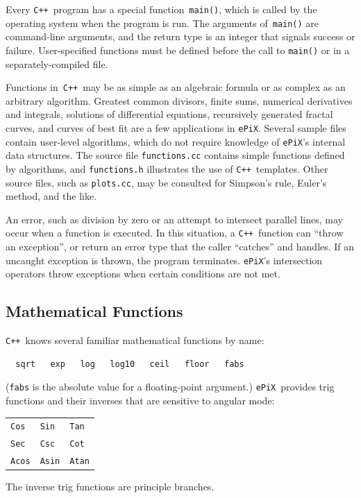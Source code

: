 \documentclass[12pt]{report}
\newcommand{\code}[1]{\texttt{#1}}
\newcommand{\filename}[1]{\texttt{#1}}
\newcommand{\ePiX}{\code{ePiX}}
\newcommand{\CXX}{\code{C++}}
\begin{document}
Every \CXX\ program has a special function~\code{main()}, which is
called by the operating system when the program is run. The arguments
of~\code{main()} are command-line arguments, and the return type is an
integer that signals success or failure. User-specified functions must
be defined before the call to \code{main()} or in a
separately-compiled file.

Functions in~\CXX\ may be as simple as an algebraic formula or as
complex as an arbitrary algorithm. Greatest common divisors, finite
sums, numerical derivatives and integrals, solutions of differential
equations, recursively generated fractal curves, and curves of best
fit are a few applications in \ePiX. Several sample files contain
user-level algorithms, which do not require knowledge of \ePiX's
internal data structures. The source file \filename{functions.cc}
contains simple functions defined by algorithms, and
\filename{functions.h} illustrates the use of \CXX\ templates. Other
source files, such as \filename{plots.cc}, may be consulted for
Simpson's rule, Euler's method, and the like.

An error, such as division by zero or an attempt to intersect parallel
lines, may occur when a function is executed. In this situation, a
\CXX\ function can ``throw an exception'', or return an error type
that the caller ``catches'' and handles. If an uncaught exception is
thrown, the program terminates. \ePiX's intersection operators throw
exceptions when certain conditions are not met.


\subsection*{Mathematical Functions}

\CXX~knows several familiar mathematical functions by name:
\begin{verbatim}
  sqrt   exp   log   log10   ceil   floor   fabs
\end{verbatim}
(\code{fabs} is the absolute value for a floating-point argument.)
\ePiX\ provides trig functions and their inverses that are sensitive
to angular mode:
\begin{center}
\begin{tabular}{p{1.25in}p{1.25in}p{1.25in}}
  \code{Cos}  & \code{Sin}  & \code{Tan} \\
  \code{Sec}  & \code{Csc}  & \code{Cot} \\
  \code{Acos} & \code{Asin} & \code{Atan}
\end{tabular}
\end{center}
The inverse trig functions are principle branches.
\end{document}
